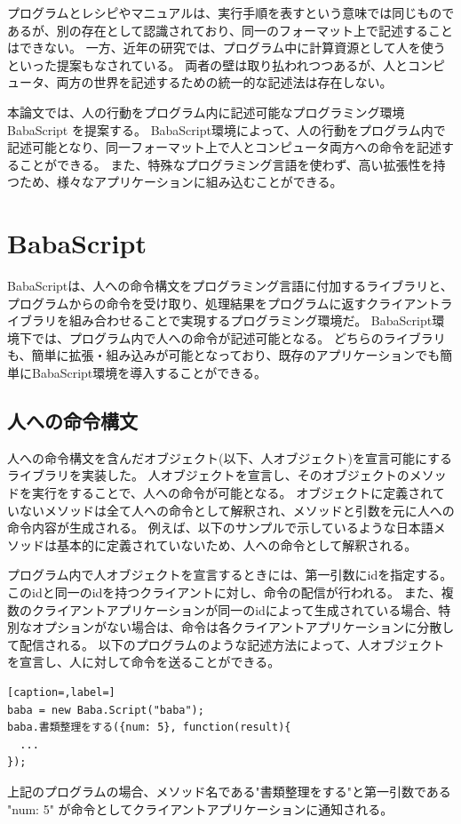 \documentclass{deimj}
\begin{document}
プログラムとレシピやマニュアルは、実行手順を表すという意味では同じものであるが、別の存在として認識されており、同一のフォーマット上で記述することはできない。
一方、近年の研究では、プログラム中に計算資源として人を使うといった提案もなされている。
両者の壁は取り払われつつあるが、人とコンピュータ、両方の世界を記述するための統一的な記述法は存在しない。

本論文では、人の行動をプログラム内に記述可能なプログラミング環境 BabaScript を提案する。
BabaScript環境によって、人の行動をプログラム内で記述可能となり、同一フォーマット上で人とコンピュータ両方への命令を記述することができる。
また、特殊なプログラミング言語を使わず、高い拡張性を持つため、様々なアプリケーションに組み込むことができる。

\section{BabaScript}

BabaScriptは、人への命令構文をプログラミング言語に付加するライブラリと、プログラムからの命令を受け取り、処理結果をプログラムに返すクライアントライブラリを組み合わせることで実現するプログラミング環境だ。
BabaScript環境下では、プログラム内で人への命令が記述可能となる。
どちらのライブラリも、簡単に拡張・組み込みが可能となっており、既存のアプリケーションでも簡単にBabaScript環境を導入することができる。

\subsection{人への命令構文}
人への命令構文を含んだオブジェクト(以下、人オブジェクト)を宣言可能にするライブラリを実装した。
人オブジェクトを宣言し、そのオブジェクトのメソッドを実行をすることで、人への命令が可能となる。
オブジェクトに定義されていないメソッドは全て人への命令として解釈され、メソッドと引数を元に人への命令内容が生成される。
例えば、以下のサンプルで示しているような日本語メソッドは基本的に定義されていないため、人への命令として解釈される。

プログラム内で人オブジェクトを宣言するときには、第一引数にidを指定する。
このidと同一のidを持つクライアントに対し、命令の配信が行われる。
また、複数のクライアントアプリケーションが同一のidによって生成されている場合、特別なオプションがない場合は、命令は各クライアントアプリケーションに分散して配信される。
以下のプログラムのような記述方法によって、人オブジェクトを宣言し、人に対して命令を送ることができる。

\begin{lstlisting}[caption=,label=]
baba = new Baba.Script("baba");
baba.書類整理をする({num: 5}, function(result){
  ...
});
\end{lstlisting}
上記のプログラムの場合、メソッド名である"書類整理をする"と第一引数である "{num: 5}" が命令としてクライアントアプリケーションに通知される。
\end{document}
